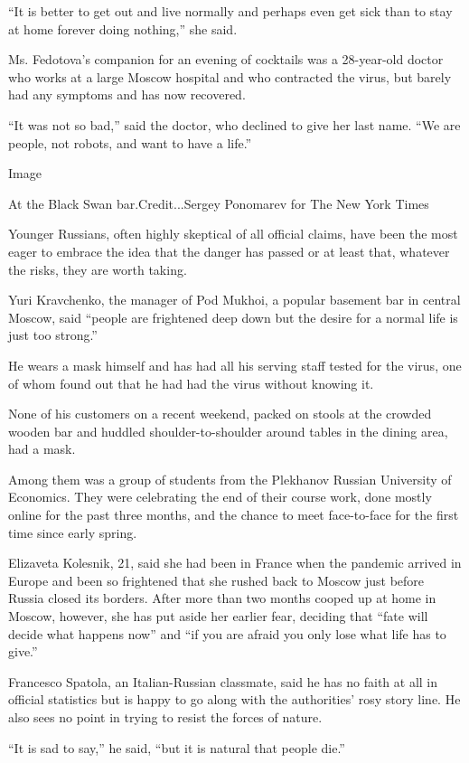 ``It is better to get out and live normally and perhaps even get sick
than to stay at home forever doing nothing,'' she said.

Ms. Fedotova's companion for an evening of cocktails was a 28-year-old
doctor who works at a large Moscow hospital and who contracted the
virus, but barely had any symptoms and has now recovered.

``It was not so bad,'' said the doctor, who declined to give her last
name. ``We are people, not robots, and want to have a life.''

Image

At the Black Swan bar.Credit...Sergey Ponomarev for The New York Times

Younger Russians, often highly skeptical of all official claims, have
been the most eager to embrace the idea that the danger has passed or at
least that, whatever the risks, they are worth taking.

Yuri Kravchenko, the manager of Pod Mukhoi, a popular basement bar in
central Moscow, said ``people are frightened deep down but the desire
for a normal life is just too strong.''

He wears a mask himself and has had all his serving staff tested for the
virus, one of whom found out that he had had the virus without knowing
it.

None of his customers on a recent weekend, packed on stools at the
crowded wooden bar and huddled shoulder-to-shoulder around tables in the
dining area, had a mask.

Among them was a group of students from the Plekhanov Russian University
of Economics. They were celebrating the end of their course work, done
mostly online for the past three months, and the chance to meet
face-to-face for the first time since early spring.

Elizaveta Kolesnik, 21, said she had been in France when the pandemic
arrived in Europe and been so frightened that she rushed back to Moscow
just before Russia closed its borders. After more than two months cooped
up at home in Moscow, however, she has put aside her earlier fear,
deciding that ``fate will decide what happens now'' and ``if you are
afraid you only lose what life has to give.''

Francesco Spatola, an Italian-Russian classmate, said he has no faith at
all in official statistics but is happy to go along with the
authorities' rosy story line. He also sees no point in trying to resist
the forces of nature.

``It is sad to say,'' he said, ``but it is natural that people die.''

